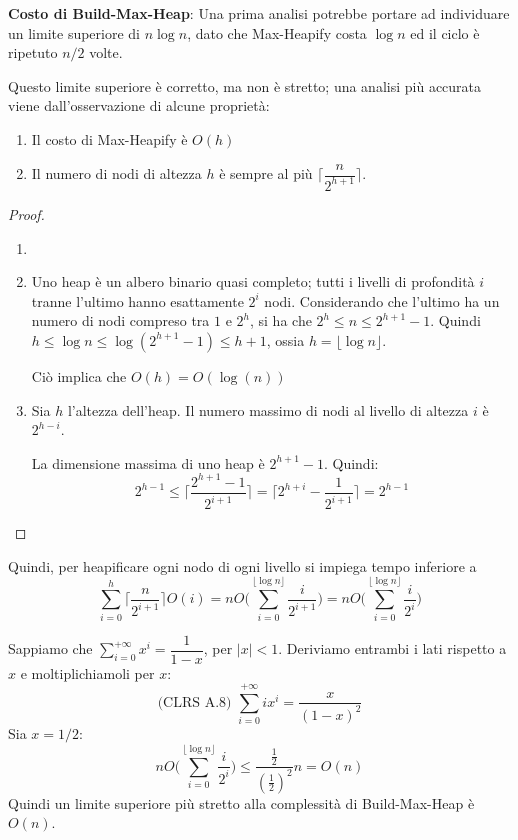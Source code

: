 \documentclass[a4paper,10pt]{article}
\theoremstyle{definition}
\begin{document}
\textbf{Costo di Build-Max-Heap}:
    Una prima analisi potrebbe portare ad individuare un limite superiore di $n \log n$, dato che Max-Heapify costa $\log n$ ed il ciclo è ripetuto $n/2$ volte. \smallskip
    
    Questo limite superiore è corretto, ma non è stretto; una analisi più accurata viene dall'osservazione di alcune proprietà:
    
    \begin{enumerate}
        \item Il costo di Max-Heapify è $O(h)$
        \item Il numero di nodi di altezza $h$ è sempre al più $\bigg \lceil \dfrac{n}{2^{h+1}}\bigg\rceil$.
    \end{enumerate}
    
    \begin{proof}
        \begin{enumerate}
         \item[]
         \item Uno heap è un albero binario quasi completo; tutti i livelli di profondità $i$ tranne l'ultimo hanno esattamente $2^i$ nodi. Considerando che l'ultimo ha un numero di nodi compreso tra $1$ e $2^h$, si ha che $2^{h} \leq n \leq 2^{h+1} - 1$. Quindi $h \leq \log n \leq \log(2^{h+1} - 1) \leq h+1$, ossia $h = \lfloor \log n \rfloor$.\smallskip
         
         Ciò implica che $O(h) = O(\log(n))$
         \item Sia $h$ l'altezza dell'heap. Il numero massimo di nodi al livello di altezza $i$ è $2^{h-i}$.
         
         La dimensione massima di uno heap è $2^{h+1}-1$. Quindi:
         \[2^{h-1} \leq \bigg\lceil \dfrac{2^{h+1}-1}{2^{i+1}} \bigg\rceil = \bigg\lceil 2^{h+i} - \dfrac{1}{2^{i+1}} \bigg\rceil = 2^{h-1}\]
         
         
         \end{enumerate}
    
    \end{proof}

    Quindi, per heapificare ogni nodo di ogni livello si impiega tempo inferiore a \[\sum_{i = 0}^h \bigg \lceil \dfrac{n}{2^{i+1}} \bigg \rceil O(i) = nO\bigg(\sum_{i = 0}^{\lfloor \log n \rfloor} \dfrac{i}{2^{i+1}} \bigg) = nO\bigg(\sum_{i = 0}^{\lfloor \log n \rfloor} \dfrac{i}{2^{i}} \bigg)\]
    
    Sappiamo che $\sum\limits_{i = 0}^{+\infty} x^i = \dfrac{1}{1-x}$, per $|x|<1$. Deriviamo entrambi i lati rispetto a $x$ e moltiplichiamoli per $x$:
    \[\text{(CLRS A.8) }\sum_{i = 0}^{+\infty} i x^i = \dfrac{x}{(1-x)^2}\]
    Sia $x = 1/2$: 
    \[nO\bigg(\sum_{i = 0}^{\lfloor \log n \rfloor} \dfrac{i}{2^{i}} \bigg) \leq \dfrac{\frac{1}{2}}{(\frac{1}{2})^2}n = O(n)\]
    Quindi un limite superiore più stretto alla complessità di Build-Max-Heap è $O(n)$.
\end{document}
